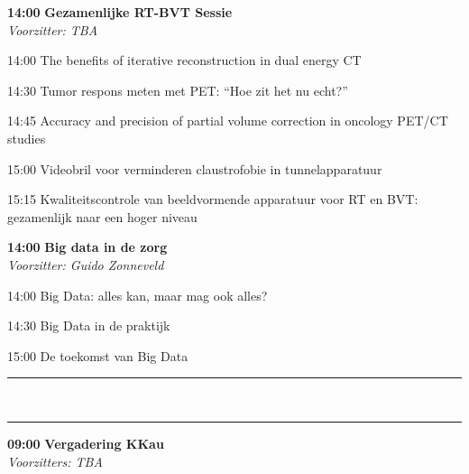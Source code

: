 \documentclass[a4paper,10pt]{report}
\begin{document}
\begin{multicols*}{3}


\begin{packed_enum}
\item[\textbf{14:00}] \textbf{Gezamenlijke RT-BVT Sessie}\\\textit{Voorzitter: TBA}
\item[14:00] The benefits of iterative reconstruction in dual energy CT
\item[14:30] Tumor respons meten met PET: “Hoe zit het nu echt?”
\item[14:45] Accuracy and precision of partial volume cor\-rection in oncology PET/CT studies
\item[15:00] Videobril voor verminderen claustrofobie in tun\-nel\-ap\-pa\-ra\-tuur
\item[15:15] Kwaliteitscontrole van beeldvormende apparatuur voor RT en BVT: gezamenlijk naar een hoger niveau
\end{packed_enum} %


\begin{packed_enum}
\item[\textbf{14:00}] \textbf{Big data in de zorg}\\\textit{Voorzitter: Guido Zonneveld}
\item[14:00] Big Data: alles kan, maar mag ook alles?
\item[14:30] Big Data in de praktijk
\item[15:00] De toekomst van Big Data
\end{packed_enum} %

\hrule\vspace{3mm}
\\
\hrule
\vfill

\begin{packed_enum}
\item[\textbf{09:00}] \textbf{Vergadering KKau}\\\textit{Voorzitters: TBA}
\end{packed_enum} %


\end{multicols*}
\end{document}
